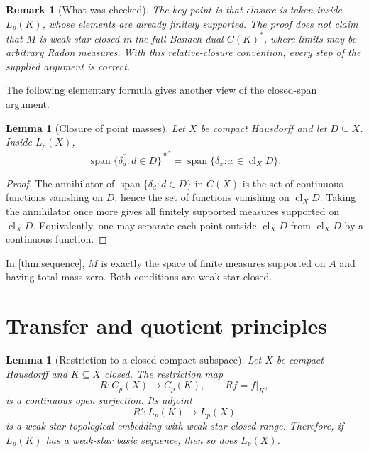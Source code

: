 \documentclass[11pt]{article}
\newtheorem{lemma}[theorem]{Lemma}
\newtheorem{remark}[theorem]{Remark}
\newcommand{\Cp}{C_p}
\newcommand{\Lp}{L_p}
\newcommand{\wstar}{w^*}
\newcommand{\spann}{\operatorname{span}}
\newcommand{\cl}{\operatorname{cl}}
\begin{document}
\begin{remark}[What was checked]
The key point is that closure is taken inside $\Lp(K)$, whose elements are
already finitely supported.  The proof does not claim that $M$ is weak-star
closed in the full Banach dual $C(K)^*$, where limits may be arbitrary Radon
measures.  With this relative-closure convention, every step of the supplied
argument is correct.
\end{remark}

The following elementary formula gives another view of the closed-span
argument.

\begin{lemma}[Closure of point masses]\label{lem:point-closure}
Let $X$ be compact Hausdorff and let $D\subseteq X$.  Inside $\Lp(X)$,
\[
 \overline{\spann\{\delta_d:d\in D\}}^{\,\wstar}
 =\spann\{\delta_x:x\in\cl_X D\}.
\]
\end{lemma}

\begin{proof}
The annihilator of $\spann\{\delta_d:d\in D\}$ in $C(X)$ is the set of
continuous functions vanishing on $D$, hence the set of functions vanishing on
$\cl_XD$.  Taking the annihilator once more gives all finitely supported
measures supported on $\cl_XD$.  Equivalently, one may separate each point
outside $\cl_XD$ from $\cl_XD$ by a continuous function.
\end{proof}

In \cref{thm:sequence}, $M$ is exactly the space of finite measures supported
on $A$ and having total mass zero.  Both conditions are weak-star closed.

\section{Transfer and quotient principles}

\begin{lemma}[Restriction to a closed compact subspace]\label{lem:restriction}
Let $X$ be compact Hausdorff and $K\subseteq X$ closed.  The restriction map
\[
 R:\Cp(X)\longrightarrow\Cp(K),\qquad Rf=f|_K,
\]
is a continuous open surjection.  Its adjoint
\[
 R':\Lp(K)\longrightarrow\Lp(X)
\]
is a weak-star topological embedding with weak-star closed range.  Therefore,
if $\Lp(K)$ has a weak-star basic sequence, then so does $\Lp(X)$.
\end{lemma}
\end{document}
